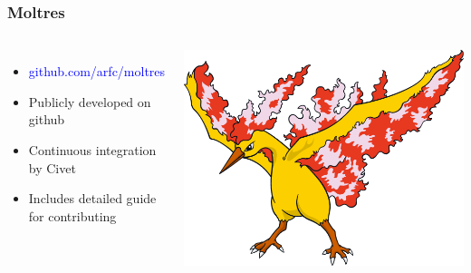 \begin{frame}
  \frametitle{Moltres}
  \begin{columns}
  \column[t]{5cm}
  \begin{itemize}
  \item{\textcolor{blue}{github.com/arfc/moltres}}
  \item{Publicly developed on github}
  \item{Continuous integration by Civet}
  \item{Includes detailed guide for contributing}
  \end{itemize}


  \column[t]{5cm}

  \includegraphics[width=\textwidth]{moltres}

  \end{columns}
\end{frame}
